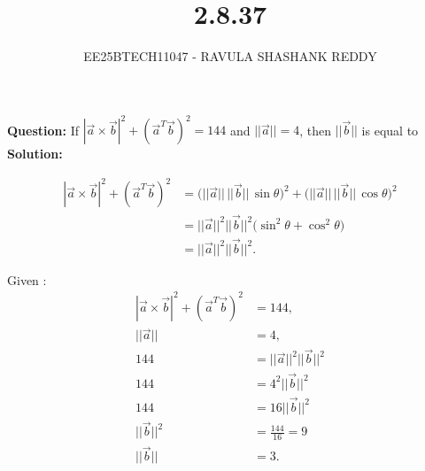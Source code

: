 \documentclass[journal]{article}
\begin{document}
	
	
	\vspace{3cm}
	
\title{2.8.37}
\author{EE25BTECH11047 - RAVULA SHASHANK REDDY}
\maketitle
\hrulefill
\bigskip 

\renewcommand{\thetable}{\theenumi}
\setlength{\intextsep}{10pt}

\textbf{Question:}  
If $|\vec{a}\times \vec{b}|^2 + (\vec{a}^T \vec{b})^2 = 144$ and $||\vec{a}|| = 4$, then $||\vec{b}||$ is equal to \underline{\hspace{2cm}}\\

\textbf{Solution:}  

\begin{align}
|\vec{a}\times \vec{b}|^2 + (\vec{a}^T \vec{b})^2
&= \big(||\vec{a}||\,||\vec{b}||\,\sin\theta\big)^2 + \big(||\vec{a}||\,||\vec{b}||\,\cos\theta\big)^2 \\[6pt]
&= ||\vec{a}||^2||\vec{b}||^2\big(\sin^2\theta+\cos^2\theta\big) \\[6pt]
&= ||\vec{a}||^2||\vec{b}||^2.
\end{align}

Given :
\begin{align}
|\vec{a}\times \vec{b}|^2 + (\vec{a}^T \vec{b})^2 &= 144, \\
||\vec{a}|| &= 4, \\
144 &= ||\vec{a}||^2||\vec{b}||^2 \\
144 &= 4^2||\vec{b}||^2 \\
144 &= 16||\vec{b}||^2 \\
||\vec{b}||^2 &= \frac{144}{16} = 9 \\
||\vec{b}|| &= 3.
\end{align}
\end{document}
